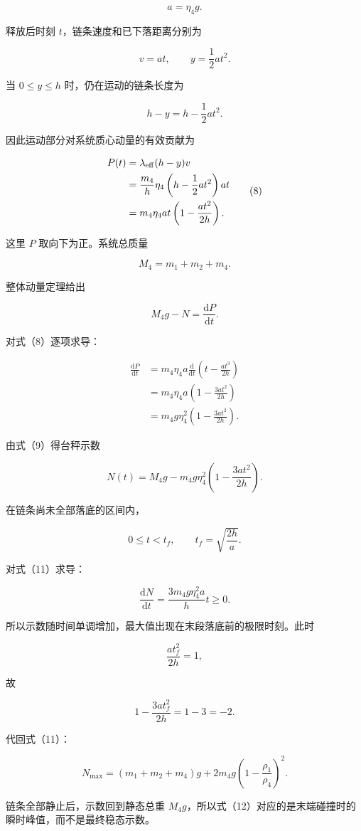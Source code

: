 \documentclass[12pt,a4paper,UTF8]{ctexart}
\begin{document}
\[a=\eta_4g. \tag{6}\]

释放后时刻 \(t\)，链条速度和已下落距离分别为

\[v=at,\qquad y=\frac12at^2. \tag{7}\]

当 \(0\le y\le h\) 时，仍在运动的链条长度为

\[h-y=h-\frac12at^2.\]

因此运动部分对系统质心动量的有效贡献为

\[\begin{aligned}
P(t)
&=\lambda_{\rm eff}(h-y)v\\
&=\frac{m_4}{h}\eta_4
\left(h-\frac12at^2\right)at\\
&=m_4\eta_4at
\left(1-\frac{at^2}{2h}\right).
\end{aligned} \tag{8}\]

这里 \(P\) 取向下为正。系统总质量

\[M_4=m_1+m_2+m_4.\]

整体动量定理给出

\[M_4g-N=\frac{\mathrm dP}{\mathrm dt}. \tag{9}\]

对式（8）逐项求导：

\[\begin{aligned}
\frac{\mathrm dP}{\mathrm dt}
&=m_4\eta_4a\frac{\mathrm d}{\mathrm dt}
\left(t-\frac{at^3}{2h}\right)\\
&=m_4\eta_4a
\left(1-\frac{3at^2}{2h}\right)\\
&=m_4g\eta_4^2
\left(1-\frac{3at^2}{2h}\right).
\end{aligned} \tag{10}\]

由式（9）得台秤示数

\[N(t)=M_4g-m_4g\eta_4^2
\left(1-\frac{3at^2}{2h}\right). \tag{11}\]

在链条尚未全部落底的区间内，

\[0\le t<t_f,\qquad
t_f=\sqrt{\frac{2h}{a}}.\]

对式（11）求导：

\[\frac{\mathrm dN}{\mathrm dt}
=\frac{3m_4g\eta_4^2a}{h}t\ge0.\]

所以示数随时间单调增加，最大值出现在末段落底前的极限时刻。此时

\[\frac{at_f^2}{2h}=1,\]

故

\[1-\frac{3at_f^2}{2h}=1-3=-2.\]

代回式（11）：

\[\boxed{
N_{\max}=(m_1+m_2+m_4)g
+2m_4g\left(1-\frac{\rho_1}{\rho_4}\right)^2
}. \tag{12}\]

链条全部静止后，示数回到静态总重
\(M_4g\)，所以式（12）对应的是末端碰撞时的瞬时峰值，而不是最终稳态示数。
\end{document}
